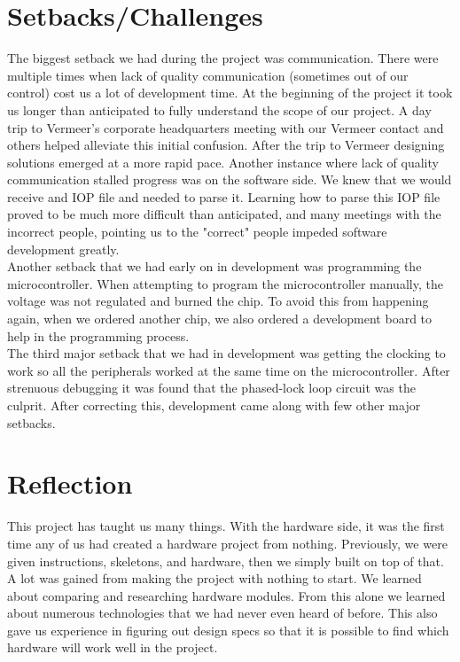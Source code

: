 \documentclass[paper=a4, fontsize=11pt]{scrartcl}
\numberwithin{equation}{section}		%
\numberwithin{figure}{section}			%
\numberwithin{table}{section}				%
\begin{document}
\section{Setbacks/Challenges} 
The biggest setback we had during the project was communication. There were multiple times when lack of quality communication (sometimes out of our control) cost us a lot of development time. At the beginning of the project it took us longer than anticipated to fully understand the scope of our project. A day trip to Vermeer's corporate headquarters meeting with our Vermeer contact and others helped alleviate this initial confusion. After the trip to Vermeer designing solutions emerged at a more rapid pace. Another instance where lack of quality communication stalled progress was on the software side. We knew that we would receive and IOP file and needed to parse it. Learning how to parse this IOP file proved to be much more difficult than anticipated, and many meetings with the incorrect people, pointing us to the "correct" people impeded software development greatly. \\

Another setback that we had early on in development was programming the microcontroller. When attempting to program the microcontroller manually, the voltage was not regulated and burned the chip. To avoid this from happening again, when we ordered another chip, we also ordered a development board to help in the programming process. \\

The third major setback that we had in development was getting the clocking to work so all the peripherals worked at the same time on the microcontroller. After strenuous debugging it was found that the phased-lock loop circuit was the culprit. After correcting this, development came along with few other major setbacks. \\

\section{Reflection}
This project has taught us many things. With the hardware side, it was the first time any of us had created a hardware project from nothing. Previously, we were given instructions, skeletons, and hardware, then we simply built on top of that. A lot was gained from making the project with nothing to start. We learned about comparing and researching hardware modules. From this alone we learned about numerous technologies that we had never even heard of before. This also gave us experience in figuring out design specs so that it is possible to find which hardware will work well in the project.\\
\end{document}
